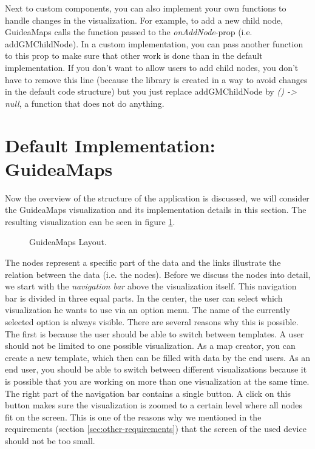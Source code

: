 Next to custom components, you can also implement your own functions to handle changes in the visualization. For example, to add a new child node, GuideaMaps calls the function passed to the \textit{onAddNode}-prop (i.e. addGMChildNode). In a custom implementation, you can pass another function to this prop to make sure that other work is done than in the default implementation. If you don't want to allow users to add child nodes, you don't have to remove this line (because the library is created in a way to avoid changes in the default code structure) but you just replace addGMChildNode by \textit{() -> null}, a function that does not do anything.



\section{Default Implementation: GuideaMaps}
Now the overview of the structure of the application is discussed, we will consider the GuideaMaps visualization and its implementation details in this section. The resulting visualization can be seen in figure \ref{fig:guideamaps}.
 
\begin{figure}[H]
	\centering
	\caption{GuideaMaps Layout.}
	\label{fig:guideamaps}
\end{figure}

The nodes represent a specific part of the data and the links illustrate the relation between the data (i.e. the nodes). Before we discuss the nodes into detail, we start with the \textit{navigation bar} above the visualization itself. This navigation bar is divided in three equal parts. In the center, the user can select which visualization he wants to use via an option menu. The name of the currently selected option is always visible. There are several reasons why this is possible. The first is because the user should be able to switch between templates. A user should not be limited to one possible visualization. As a map creator, you can create a new template, which then can be filled with data by the end users. As an end user, you should be able to switch between different visualizations because it is possible that you are working on more than one visualization at the same time.\\

The right part of the navigation bar contains a single button. A click on this button makes sure the visualization is zoomed to a certain level where all nodes fit on the screen. This is one of the reasons why we mentioned in the requirements (section \ref{sec:other-requirements}) that the screen of the used device should not be too small.\\

